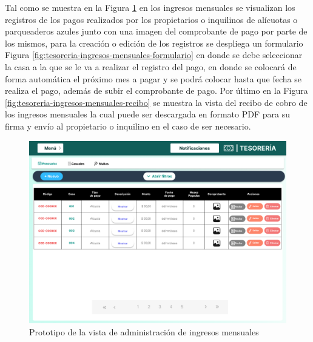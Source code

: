 Tal como se muestra en la Figura \ref{fig:tesoreria-ingresos-mensuales} en los ingresos mensuales se visualizan los registros de los pagos realizados por los propietarios o inquilinos de alícuotas o parqueaderos azules junto con una imagen del comprobante de pago por parte de los mismos, para la creación o edición de los registros se despliega un formulario Figura \ref{fig:tesoreria-ingresos-mensuales-formulario} en donde se debe seleccionar la casa a la que se le va a realizar el registro del pago, en donde se colocará de forma automática el próximo mes a pagar y se podrá colocar hasta que fecha se realiza el pago, además de subir el comprobante de pago.
Por último en la Figura \ref{fig:tesoreria-ingresos-mensuales-recibo} se muestra la vista del recibo de cobro de los ingresos mensuales la cual puede ser descargada en formato PDF para su firma y envío al propietario o inquilino en el caso de ser necesario.

\begin{figure}[H]
    \centering
    \includegraphics[width=1\textwidth]{resources/images/tesoreia - ingresos - mensuales}
    \caption{Prototipo de la vista de administración de ingresos mensuales}
    \label{fig:tesoreria-ingresos-mensuales}
\end{figure}


